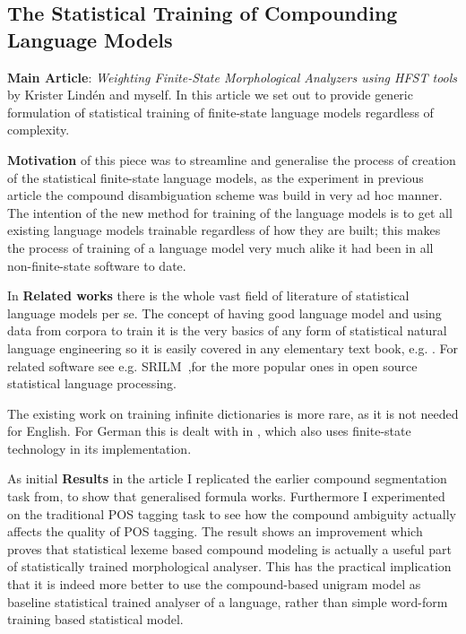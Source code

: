 \documentclass[officiallayout,draft]{unihelcompling}
\begin{document}
\subsection{The Statistical Training of Compounding Language Models}

\textbf{Main Article}: \emph{Weighting Finite-State Morphological Analyzers
using HFST tools} by Krister Lindén and myself. In this article we set out
to provide generic formulation of statistical training of finite-state
language models regardless of complexity.

\textbf{Motivation} of this piece was to streamline and generalise the process
of creation of the statistical finite-state language models, as the experiment
in previous article \cite{pirinen2009weighted} the compound disambiguation
scheme was build in very ad hoc manner. The intention of the new method
for training of the language models is to get all existing language models
trainable regardless of how they are built; this makes the process of training
of a language model very much alike it had been in all non-finite-state
software to date.

In \textbf{Related works} there is the whole vast field of literature of
statistical language models per se. The concept of having good language model
and using data from corpora to train it is the very basics of any form of
statistical natural language engineering so it is easily covered in any
elementary text book, e.g. \cite{noppakirja}. For related software see e.g.
SRILM~\cite{stolcke2002srilm},for the more popular ones in open source
statistical language processing.

The existing work on training infinite dictionaries is more rare, as it is not
needed for English. For German this is dealt with in \cite{schiller2006german},
which also uses finite-state technology in its implementation.

As initial \textbf{Results} in the article I replicated the earlier compound
segmentation task from, to show that generalised formula works.
Furthermore I experimented on the traditional POS tagging task to see how the
compound ambiguity actually affects the quality of POS tagging. The result
shows an improvement which proves that statistical lexeme based compound
modeling is actually a useful part of statistically trained morphological
analyser. This has the practical implication that it is indeed more better to
use the compound-based unigram model as baseline statistical trained analyser
of a language, rather than simple word-form training based statistical model.
\end{document}
